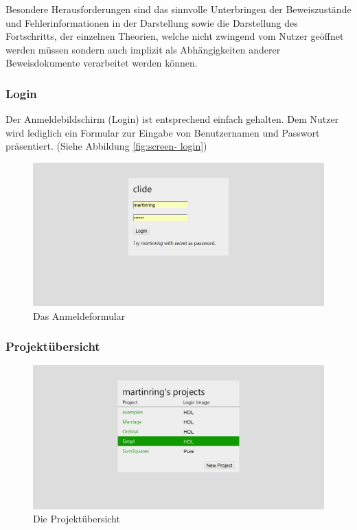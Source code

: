 Besondere Herausforderungen sind das sinnvolle Unterbringen der Beweiszustände und
Fehlerinformationen in der Darstellung sowie die Darstellung des Fortschritts, der einzelnen
Theorien, welche nicht zwingend vom Nutzer geöffnet werden müssen sondern auch implizit als
Abhängigkeiten anderer Beweisdokumente verarbeitet werden können.

\subsubsection{Login}

Der Anmeldebildschirm (Login) ist entsprechend einfach gehalten. Dem Nutzer wird lediglich ein
Formular zur Eingabe von Benutzernamen und Passwort präsentiert. (Siehe Abbildung \ref{fig:screen-
login})

\begin{figure}[ht]
\includegraphics[width=\linewidth]{images/screen-login}
  \caption{Das Anmeldeformular}
  \label{fig:screen-login}
\end{figure}

\subsubsection{Projektübersicht}

\begin{figure}[ht]
\includegraphics[width=\linewidth]{images/screen-projects}
  \caption{Die Projektübersicht}
  \label{fig:screen-projects}
\end{figure}


